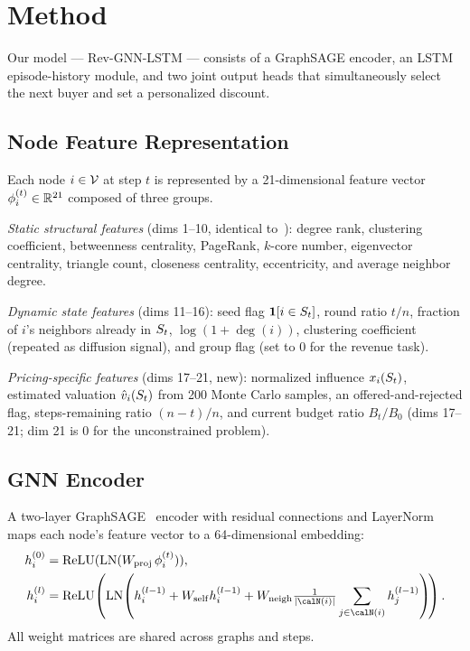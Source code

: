 
\section{Method}
\label{sec:method}

Our model — Rev-GNN-LSTM — consists of a GraphSAGE encoder,
an LSTM episode-history module, and two joint output heads that simultaneously
select the next buyer and set a personalized discount.

\subsection{Node Feature Representation}
\label{sec:features}

Each node $i \in \mathcal{V}$ at step $t$ is represented by a 21-dimensional feature vector
$\phi_i^{(t)} \in \mathbb{R}^{21}$ composed of three groups.

\emph{Static structural features} (dims 1–10, identical to~\citet{anon_wsdm27}):
degree rank, clustering coefficient, betweenness centrality, PageRank,
$k$-core number, eigenvector centrality, triangle count, closeness centrality,
eccentricity, and average neighbor degree.

\emph{Dynamic state features} (dims 11–16):
seed flag $\mathbf{1}[i \in S_t]$, round ratio $t/n$,
fraction of $i$'s neighbors already in $S_t$,
$\log(1 + \deg(i))$, clustering coefficient (repeated as diffusion signal),
and group flag (set to 0 for the revenue task).

\emph{Pricing-specific features} (dims 17–21, new):
normalized influence $x_i(S_t)$,
estimated valuation $\hat{v}_i(S_t)$ from 200 Monte Carlo samples,
an offered-and-rejected flag,
steps-remaining ratio $(n - t)/n$,
and current budget ratio $B_t / B_0$ (dims 17–21; dim 21 is $0$ for the
unconstrained problem).

\subsection{GNN Encoder}
\label{sec:gnn}

A two-layer GraphSAGE~\citep{hamilton2017inductive} encoder with residual
connections and LayerNorm maps each node's feature vector to a 64-dimensional
embedding:
\begin{align}
  h_i^{(0)} &= \mathrm{ReLU}(\mathrm{LN}(W_{\mathrm{proj}}\,\phi_i^{(t)})),\\
  h_i^{(l)} &= \mathrm{ReLU}\!\left(\mathrm{LN}\!\left(h_i^{(l-1)}
    + W_{\mathrm{self}} h_i^{(l-1)}
    + W_{\mathrm{neigh}} \tfrac{1}{|\calN(i)|}\sum_{j\in\calN(i)} h_j^{(l-1)}
  \right)\!\right).
\end{align}
All weight matrices are shared across graphs and steps.

